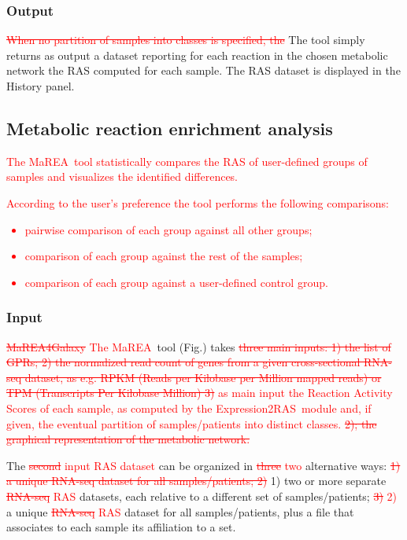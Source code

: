 \documentclass[preprint,12pt,authoryear]{elsarticle}
\newcommand{\red}{\textcolor{red}}
\newcommand{\mareagalaxy}{\textsf{MaREA4Galaxy}}
\newcommand{\mareaTool}{\textsf{MaREA}}
\newcommand{\RASTool}{\textsf{Expression2RAS}}
\begin{document}
\subsubsection{Output} 
\red{\sout{When no partition of samples into classes is specified, the}}
The tool simply returns as output a dataset reporting for each reaction in the chosen metabolic network the RAS computed for each sample. The RAS dataset is displayed in the History panel.

\subsection{Metabolic reaction enrichment analysis}
\red{The \mareaTool\ tool statistically compares the RAS of user-defined groups of samples
\citep{marea} and visualizes the identified differences.}

\red{According to the user's preference the tool performs the following comparisons: 
\begin{itemize}
\item pairwise comparison of each group against all other groups;
\item comparison of each group against the rest of the samples;
\item comparison of each group against a user-defined control group.
\end{itemize}}

\subsubsection{Input}

\red{\sout{\mareagalaxy} The \mareaTool~}tool (Fig.\label{fig:screenshot3}) takes \red{\sout{three main inputs: 1) the list of GPRs; 2) the normalized read count of genes from a given cross-sectional RNA-seq dataset, as e.g. RPKM (Reads per Kilobase per Million mapped reads) or TPM (Transcripts Per Kilobase Million) 3)} as main input the Reaction Activity Scores of each sample, as computed by the \RASTool\ module and\red{, if given,} the eventual partition of samples/patients into distinct classes. \sout{2); the graphical representation of the metabolic network.}}
 

The \red{\sout{second} input RAS dataset} can be organized in \red{\sout{three} two} alternative ways: \red{\sout{1) a unique RNA-seq  dataset for all samples/patients; 2)}} 1) two or more separate \red{\sout{RNA-seq} RAS} datasets, each relative to a different set of samples/patients; \red{\sout{3)} 2)} a unique \red{\sout{RNA-seq} RAS} dataset for all samples/patients, plus a file that associates to each sample its affiliation to a set.
\end{document}
